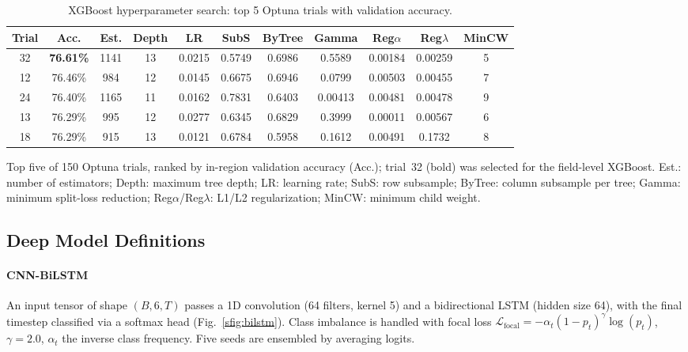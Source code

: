 \documentclass[journal]{IEEEtran}
\begin{document}
\begin{table}[!t]
\centering
\scriptsize
\caption{XGBoost hyperparameter search: top 5 Optuna trials with validation accuracy.}
\label{stab:trials}
\renewcommand{\arraystretch}{1.1}
\setlength{\tabcolsep}{6pt}
\begin{tabular}{ccccccccccc}
\toprule
\textbf{Trial} & \textbf{Acc.} & \textbf{Est.} & \textbf{Depth} & \textbf{LR} & \textbf{SubS} & \textbf{ByTree} & \textbf{Gamma} & \textbf{Reg$\alpha$} & \textbf{Reg$\lambda$} & \textbf{MinCW} \\
\midrule
32 & \textbf{76.61\%} & 1141 & 13 & 0.0215 & 0.5749 & 0.6986 & 0.5589 & 0.00184 & 0.00259 & 5 \\
12 & 76.46\% & 984  & 12 & 0.0145 & 0.6675 & 0.6946 & 0.0799 & 0.00503 & 0.00455 & 7 \\
24 & 76.40\% & 1165 & 11 & 0.0162 & 0.7831 & 0.6403 & 0.00413 & 0.00481 & 0.00478 & 9 \\
13 & 76.29\% & 995  & 12 & 0.0277 & 0.6345 & 0.6829 & 0.3999 & 0.00011 & 0.00567 & 6 \\
18 & 76.29\% & 915  & 13 & 0.0121 & 0.6784 & 0.5958 & 0.1612 & 0.00491 & 0.1732 & 8 \\
\bottomrule
\end{tabular}
\par\vspace{3pt}
\begin{minipage}{\textwidth}
\footnotesize
Top five of 150 Optuna trials, ranked by in-region validation accuracy (Acc.); trial~32 (bold) was
selected for the field-level XGBoost. Est.: number of estimators; Depth: maximum tree depth; LR:
learning rate; SubS: row subsample; ByTree: column subsample per tree; Gamma: minimum split-loss
reduction; Reg$\alpha$/Reg$\lambda$: L1/L2 regularization; MinCW: minimum child weight.
\end{minipage}
\end{table}

\subsection{Deep Model Definitions}
\paragraph{CNN-BiLSTM} An input tensor of shape $(B,6,T)$ passes a 1D convolution (64 filters,
kernel 5) and a bidirectional LSTM (hidden size 64), with the final timestep classified via a
softmax head (Fig.~\ref{sfig:bilstm}). Class imbalance is handled with focal loss
$\mathcal{L}_{\text{focal}} = -\alpha_t (1-p_t)^{\gamma}\log(p_t)$, $\gamma=2.0$, $\alpha_t$ the
inverse class frequency. Five seeds are ensembled by averaging logits.
\end{document}
